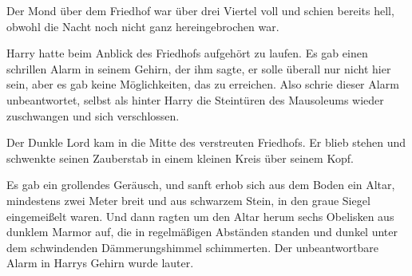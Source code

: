 Der Mond über dem Friedhof war über drei Viertel voll und schien bereits hell, obwohl die Nacht noch nicht ganz hereingebrochen war.

Harry hatte beim Anblick des Friedhofs aufgehört zu laufen. Es gab einen schrillen Alarm in seinem Gehirn, der ihm sagte, er solle überall nur nicht hier sein, aber es gab keine Möglichkeiten, das zu erreichen. Also schrie dieser Alarm unbeantwortet, selbst als hinter Harry die Steintüren des Mausoleums wieder zuschwangen und sich verschlossen.

Der Dunkle Lord kam in die Mitte des verstreuten Friedhofs. Er blieb stehen und schwenkte seinen Zauberstab in einem kleinen Kreis über seinem Kopf.

Es gab ein grollendes Geräusch, und sanft erhob sich aus dem Boden ein Altar, mindestens zwei Meter breit und aus schwarzem Stein, in den graue Siegel eingemeißelt waren. Und dann ragten um den Altar herum sechs Obelisken aus dunklem Marmor auf, die in regelmäßigen Abständen standen und dunkel unter dem schwindenden Dämmerungshimmel schimmerten.
Der unbeantwortbare Alarm in Harrys Gehirn wurde lauter.

